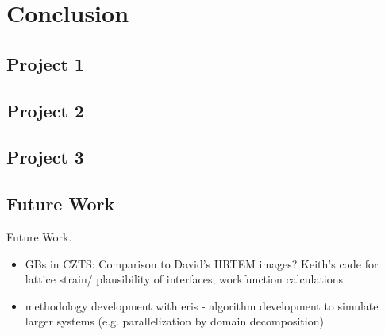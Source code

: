 
\chapter{Conclusion}

\label{ch:conclusions}

\section{Project 1}

\section{Project 2}

\section{Project 3}

\section{Future Work}

Future Work.
\begin{itemize}
\item GBs in CZTS: Comparison to David's HRTEM images? Keith's code for lattice strain/ plausibility of interfaces, workfunction calculations
\item methodology development with eris - algorithm development to simulate larger systems (e.g. parallelization by domain decomposition)
\end{itemize}

 